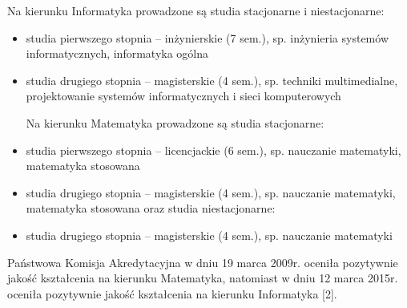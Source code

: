 \documentclass[a4paper,12pt]{article}
\begin{document}
Na kierunku Informatyka prowadzone są studia stacjonarne i niestacjonarne:

\begin{itemize}

\item studia pierwszego stopnia – inżynierskie (7 sem.), sp. inżynieria systemów informatycznych, informatyka
ogólna

\item studia drugiego stopnia – magisterskie (4 sem.), sp. techniki multimedialne, projektowanie systemów
informatycznych i sieci komputerowych

Na kierunku Matematyka prowadzone są studia stacjonarne:

\item studia pierwszego stopnia – licencjackie (6 sem.), sp. nauczanie matematyki, matematyka stosowana

\item studia drugiego stopnia – magisterskie (4 sem.), sp. nauczanie matematyki, matematyka stosowana
oraz studia niestacjonarne:

\item studia drugiego stopnia – magisterskie (4 sem.), sp. nauczanie matematyki

\end{itemize}

Państwowa Komisja Akredytacyjna w dniu 19 marca 2009r. oceniła pozytywnie jakość kształcenia na kierunku
Matematyka, natomiast w dniu 12 marca 2015r. oceniła pozytywnie jakość kształcenia na kierunku
Informatyka [2].
\end{document}
